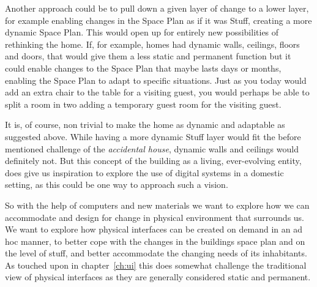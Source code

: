 Another approach could be to pull down a given layer of change to a lower layer, for example enabling changes in the Space Plan as if it was Stuff, creating a more dynamic Space Plan.
This would open up for entirely new possibilities of rethinking the home. 
If, for example, homes had dynamic walls, ceilings, floors and doors, that would give them a less static and permanent function but it could enable changes to the Space Plan that maybe lasts days or months, enabling the Space Plan to adapt to specific situations.
Just as you today would add an extra chair to the table for a visiting guest, you would perhaps be able to split a room in two adding a temporary guest room for the visiting guest.

It is, of course, non trivial to make the home as dynamic and adaptable as suggested above.
While having a more dynamic Stuff layer would fit the before mentioned challenge of the \emph{accidental house}, dynamic walls and ceilings would definitely not. 
But this concept of the building as a living, ever-evolving entity, does give us inspiration to explore the use of digital systems in a domestic setting, as this could be one way to approach such a vision.

So with the help of computers and new materials we want to explore how we can accommodate and design for change in physical environment that surrounds us.
We want to explore how physical interfaces can be created on demand in an ad hoc manner, to better cope with the changes in the buildings space plan and on the level of stuff, and better accommodate the changing needs of its inhabitants.
As touched upon in chapter~\ref{ch:ui} this does somewhat challenge the traditional view of physical interfaces as they are generally considered static and permanent.





